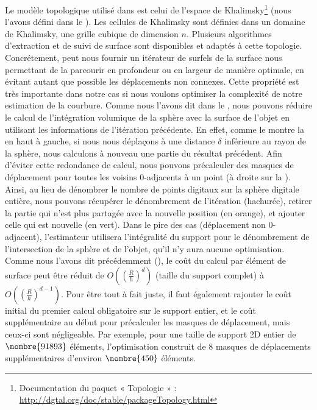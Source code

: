 Le modèle topologique utilisé dans \DGtal est celui de l'espace de
Khalimsky\footnote{Documentation du paquet « Topologie » :
\url{http://dgtal.org/doc/stable/packageTopology.html}} (nous l'avons défini
dans le ). Les cellules de Khalimsky sont définies
dans un domaine de Khalimsky, \cad une grille cubique de dimension $n$.
Plusieurs algorithmes d'extraction et de suivi de surface sont disponibles et
adaptés à cette topologie. Concrétement, \DGtal peut nous fournir un itérateur
de surfels de la surface nous permettant de la parcourir en profondeur ou en
largeur de manière optimale, \cad en évitant autant que possible les
déplacements non connexes. Cette propriété est très importante dans notre cas si
nous voulons optimiser la complexité de notre estimation de la courbure. Comme
nous l'avons dit dans le , nous pouvons réduire le
calcul de l'intégration volumique de la sphère avec la surface de l'objet en
utilisant les informations de l'itération précédente. En effet, comme le montre
la  en haut à gauche, si nous nous déplaçons à une
distance $\delta$ inférieure au rayon de la sphère, nous calculons à nouveau une
partie du résultat précédent. Afin d'éviter cette redondance de calcul, nous
pouvons précalculer des masques de déplacement pour toutes les voisins
$0$-adjacents à un point (à droite sur la ).
Ainsi, au lieu de dénombrer le nombre de points digitaux sur la sphère digitale
entière, nous pouvons récupérer le dénombrement de l'itération (hachurée),
retirer la partie qui n'est plus partagée avec la nouvelle position (en orange),
et ajouter celle qui est nouvelle (en vert).
Dans le pire des cas (déplacement non $0$-adjacent), l'estimateur utilisera
l'intégralité du support pour le dénombrement de l'intersection de la sphère et
de l'objet, \cad qu'il n'y aura aucune optimisation. Comme nous l'avons dit
précédemment (), le coût du calcul par élément de
surface peut être réduit de $O\left(\left(\frac{R}{h}\right)^d\right)$ (taille du support complet) à
$O\left(\left(\frac{R}{h}\right)^{d-1}\right)$. Pour être tout à fait juste, il faut également
rajouter le coût initial du premier calcul obligatoire sur le support entier, et
le coût supplémentaire au début pour précalculer les masques de déplacement,
mais ceux-ci sont négligeable. Par exemple, pour une taille de support 2D entier
de $\nombre{91893}$ éléments, l'optimisation construit de $8$ masques de
déplacements supplémentaires d'environ $\nombre{450}$ éléments.

